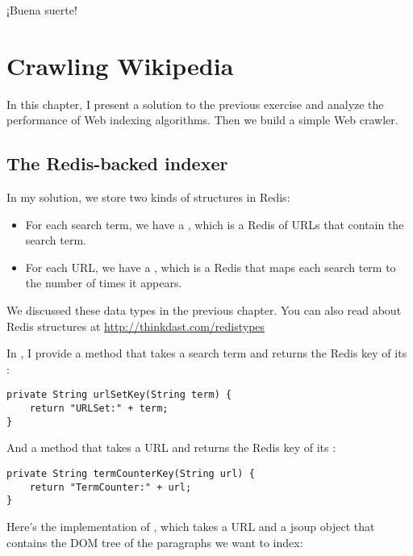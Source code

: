 \documentclass[12pt]{book}
\theoremstyle{exercise}
\begin{document}
¡Buena suerte!



\chapter{Crawling Wikipedia}

In this chapter, I present a solution to the previous exercise and
analyze the performance of Web indexing algorithms. Then we build a
simple Web crawler.

\section{The Redis-backed indexer}
\label{redis-indexer}


In my solution, we store two kinds of structures in Redis:

\begin{itemize}

\item
  For each search term, we have a , which is a Redis 
  of URLs that contain the search term.

\item
  For each URL, we have a , which is a Redis 
  that maps each search term to the number of times it appears.

\end{itemize}

We discussed these data types in the previous chapter. You can also
read about Redis structures at \url{http://thinkdast.com/redistypes}


In , I provide a method that takes a search term
and returns the Redis key of its :

\begin{verbatim}
private String urlSetKey(String term) {
    return "URLSet:" + term;
}
\end{verbatim}

And a method that takes a URL and returns the Redis key of its
:

\begin{verbatim}
private String termCounterKey(String url) {
    return "TermCounter:" + url;
}
\end{verbatim}

Here's the implementation of , which takes a URL and a
jsoup  object that contains the DOM tree of the
paragraphs we want to index:
\end{document}
